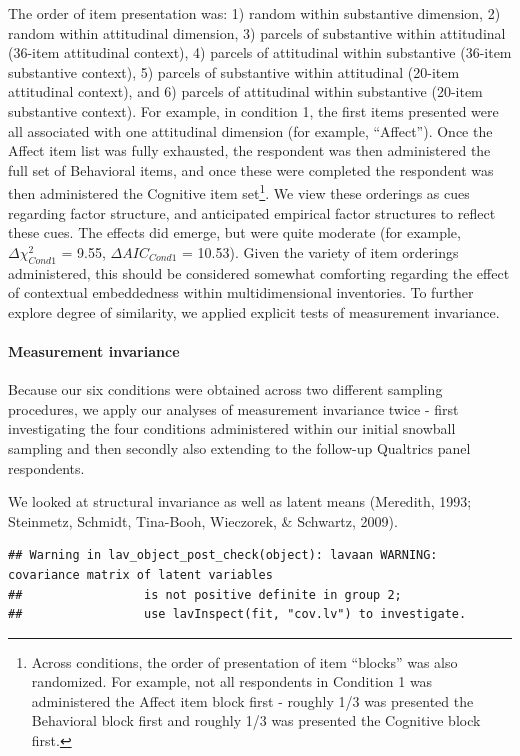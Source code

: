\documentclass[
  english,
  man]{apa6}
\let\oldparagraph\paragraph
\renewcommand{\paragraph}[1]{\oldparagraph{#1}\mbox{}}
\begin{document}
The order of item presentation was: 1) random within substantive dimension, 2) random within attitudinal dimension, 3) parcels of substantive within attitudinal (36-item attitudinal context), 4) parcels of attitudinal within substantive (36-item substantive context), 5) parcels of substantive within attitudinal (20-item attitudinal context), and 6) parcels of attitudinal within substantive (20-item substantive context). For example, in condition 1, the first items presented were all associated with one attitudinal dimension (for example, \enquote{Affect}). Once the Affect item list was fully exhausted, the respondent was then administered the full set of Behavioral items, and once these were completed the respondent was then administered the Cognitive item set\footnote{Across conditions, the order of presentation of item \enquote{blocks} was also randomized. For example, not all respondents in Condition 1 was administered the Affect item block first - roughly 1/3 was presented the Behavioral block first and roughly 1/3 was presented the Cognitive block first.}. We view these orderings as cues regarding factor structure, and anticipated empirical factor structures to reflect these cues. The effects did emerge, but were quite moderate (for example, \(\Delta{\chi^2_{Cond1}}\) = 9.55, \(\Delta{AIC_{Cond1}}\) = 10.53). Given the variety of item orderings administered, this should be considered somewhat comforting regarding the effect of contextual embeddedness within multidimensional inventories. To further explore degree of similarity, we applied explicit tests of measurement invariance.

\hypertarget{measurement-invariance}{%
\paragraph{Measurement invariance}\label{measurement-invariance}}

Because our six conditions were obtained across two different sampling procedures, we apply our analyses of measurement invariance twice - first investigating the four conditions administered within our initial snowball sampling and then secondly also extending to the follow-up Qualtrics panel respondents.

We looked at structural invariance as well as latent means (Meredith, 1993; Steinmetz, Schmidt, Tina-Booh, Wieczorek, \& Schwartz, 2009).

\begin{verbatim}
## Warning in lav_object_post_check(object): lavaan WARNING: covariance matrix of latent variables
##                 is not positive definite in group 2;
##                 use lavInspect(fit, "cov.lv") to investigate.
\end{verbatim}
\end{document}
